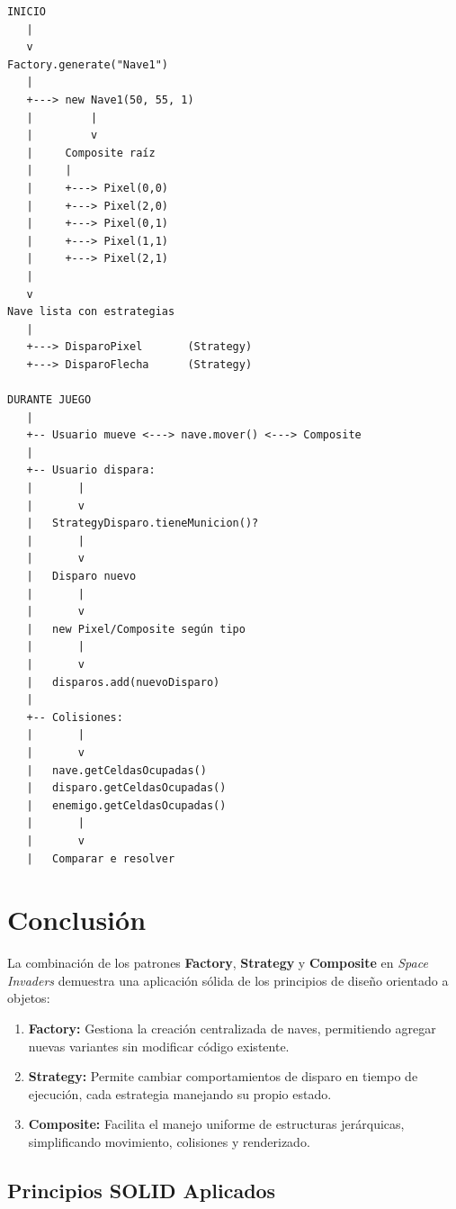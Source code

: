 \documentclass[12pt]{article}
\begin{document}
\begin{verbatim}
INICIO
   |
   v
Factory.generate("Nave1")
   |
   +---> new Nave1(50, 55, 1)
   |         |
   |         v
   |     Composite raíz
   |     |
   |     +---> Pixel(0,0)
   |     +---> Pixel(2,0)
   |     +---> Pixel(0,1)
   |     +---> Pixel(1,1)
   |     +---> Pixel(2,1)
   |
   v
Nave lista con estrategias
   |
   +---> DisparoPixel       (Strategy)
   +---> DisparoFlecha      (Strategy)
   
DURANTE JUEGO
   |
   +-- Usuario mueve <---> nave.mover() <---> Composite
   |
   +-- Usuario dispara:
   |       |
   |       v
   |   StrategyDisparo.tieneMunicion()?
   |       |
   |       v
   |   Disparo nuevo
   |       |
   |       v
   |   new Pixel/Composite según tipo
   |       |
   |       v
   |   disparos.add(nuevoDisparo)
   |
   +-- Colisiones:
   |       |
   |       v
   |   nave.getCeldasOcupadas()
   |   disparo.getCeldasOcupadas()
   |   enemigo.getCeldasOcupadas()
   |       |
   |       v
   |   Comparar e resolver
\end{verbatim}

\section{Conclusión}

La combinación de los patrones \textbf{Factory}, \textbf{Strategy} y \textbf{Composite} en \textit{Space Invaders} demuestra una aplicación sólida de los principios de diseño orientado a objetos:

\begin{enumerate}
    \item \textbf{Factory:} Gestiona la creación centralizada de naves, permitiendo agregar nuevas variantes sin modificar código existente.
    
    \item \textbf{Strategy:} Permite cambiar comportamientos de disparo en tiempo de ejecución, cada estrategia manejando su propio estado.
    
    \item \textbf{Composite:} Facilita el manejo uniforme de estructuras jerárquicas, simplificando movimiento, colisiones y renderizado.
\end{enumerate}

\subsection{Principios SOLID Aplicados}
\end{document}
